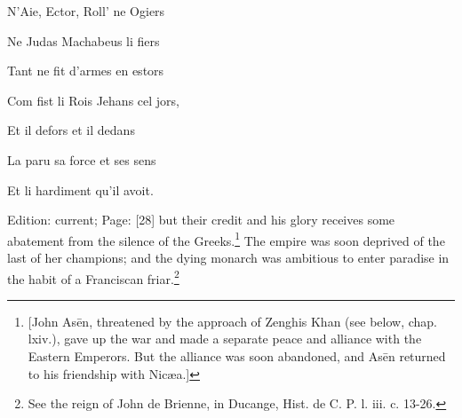 {N\texthebrew{}’Aie, Ector, Roll\texthebrew{}’ ne Ogiers

Ne Judas Machabeus li fiers

Tant ne fit d\texthebrew{}’armes en estors

Com fist li Rois Jehans cel jors,

Et il defors et il dedans

La paru sa force et ses sens

Et li hardiment qu\texthebrew{}’il avoit.} Edition: current; Page: [28] but their credit and his glory receives some abatement from the silence of the Greeks.\footnote{[John Asēn, threatened by the approach of Zenghis Khan (see below, chap. lxiv.), gave up the war and made a separate peace and alliance with the Eastern Emperors. But the alliance was soon abandoned, and Asēn returned to his friendship with Nicæa.]} The empire was soon deprived of the last of her champions; and the dying monarch was ambitious to enter paradise in the habit of a Franciscan friar.\footnote{See the reign of John de Brienne, in Ducange, Hist. de C. P. l. iii. c. 13-26.}

